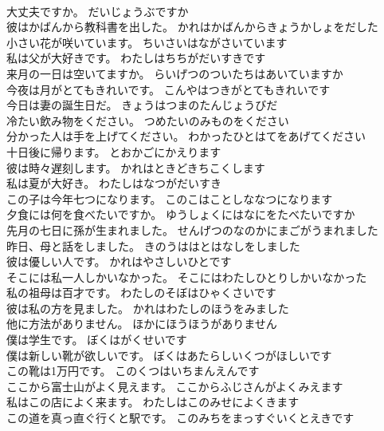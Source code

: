 \documentclass[8pt]{extreport}
\begin{document}
\begin{CJK}{UTF8}{min}
\\	大丈夫ですか。	だいじょうぶですか 
\\	彼はかばんから教科書を出した。	かれはかばんからきょうかしょをだした 
\\	小さい花が咲いています。	ちいさいはながさいています 
\\	私は父が大好きです。	わたしはちちがだいすきです 
\\	来月の一日は空いてますか。	らいげつのついたちはあいていますか 
\\	今夜は月がとてもきれいです。	こんやはつきがとてもきれいです 
\\	今日は妻の誕生日だ。	きょうはつまのたんじょうびだ 
\\	冷たい飲み物をください。	つめたいのみものをください 
\\	分かった人は手を上げてください。	わかったひとはてをあげてください 
\\	十日後に帰ります。	とおかごにかえります 
\\	彼は時々遅刻します。	かれはときどきちこくします 
\\	私は夏が大好き。	わたしはなつがだいすき 
\\	この子は今年七つになります。	このこはことしななつになります 
\\	夕食には何を食べたいですか。	ゆうしょくにはなにをたべたいですか 
\\	先月の七日に孫が生まれました。	せんげつのなのかにまごがうまれました 
\\	昨日、母と話をしました。	きのうははとはなしをしました 
\\	彼は優しい人です。	かれはやさしいひとです 
\\	そこには私一人しかいなかった。	そこにはわたしひとりしかいなかった 
\\	私の祖母は百才です。	わたしのそぼはひゃくさいです 
\\	彼は私の方を見ました。	かれはわたしのほうをみました 
\\	他に方法がありません。	ほかにほうほうがありません 
\\	僕は学生です。	ぼくはがくせいです 
\\	僕は新しい靴が欲しいです。	ぼくはあたらしいくつがほしいです 
\\	この靴は1万円です。	このくつはいちまんえんです 
\\	ここから富士山がよく見えます。	ここからふじさんがよくみえます 
\\	私はこの店によく来ます。	わたしはこのみせによくきます 
\\	この道を真っ直ぐ行くと駅です。	このみちをまっすぐいくとえきです 

\end{CJK}
\end{document}
